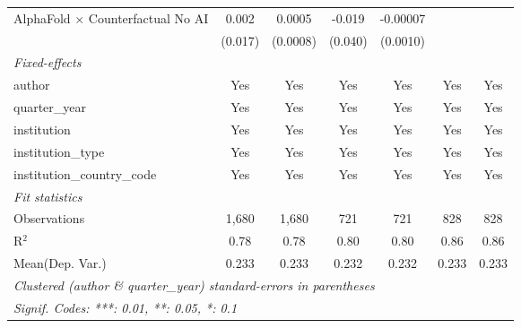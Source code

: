 \begin{tabular}{lcccccc}
   AlphaFold $\times$ Counterfactual No AI  & 0.002   & 0.0005   & -0.019  & -0.00007 &         &   \\   
                                            & (0.017) & (0.0008) & (0.040) & (0.0010) &         &   \\   
   \midrule
   \emph{Fixed-effects}\\
   author                                   & Yes     & Yes      & Yes     & Yes      & Yes     & Yes\\  
   quarter\_year                            & Yes     & Yes      & Yes     & Yes      & Yes     & Yes\\  
   institution                              & Yes     & Yes      & Yes     & Yes      & Yes     & Yes\\  
   institution\_type                        & Yes     & Yes      & Yes     & Yes      & Yes     & Yes\\  
   institution\_country\_code               & Yes     & Yes      & Yes     & Yes      & Yes     & Yes\\  
   \midrule
   \emph{Fit statistics}\\
   Observations                             & 1,680   & 1,680    & 721     & 721      & 828     & 828\\  
   R$^2$                                    & 0.78    & 0.78     & 0.80    & 0.80     & 0.86    & 0.86\\  
Mean(Dep. Var.) & 0.233 & 0.233 & 0.232 & 0.232 & 0.233 & 0.233 \\
   \midrule \midrule
   \multicolumn{7}{l}{\emph{Clustered (author \& quarter\_year) standard-errors in parentheses}}\\
   \multicolumn{7}{l}{\emph{Signif. Codes: ***: 0.01, **: 0.05, *: 0.1}}\\
\end{tabular}
\par\endgroup

